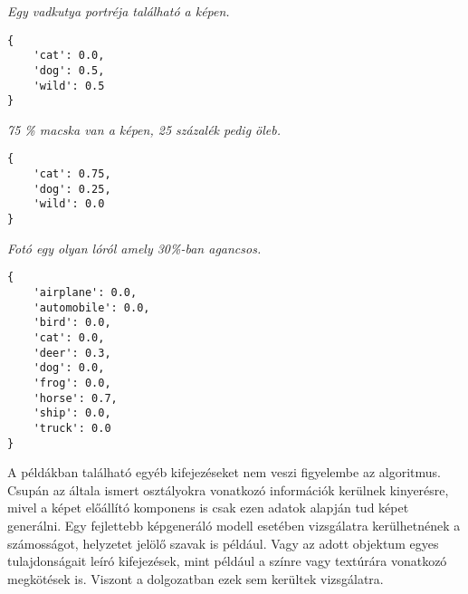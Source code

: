 \noindent\textit{Egy vadkutya portréja található a képen.}
\small{
\begin{verbatim}
{
    'cat': 0.0,
    'dog': 0.5,
    'wild': 0.5
}
\end{verbatim}
}

\noindent\textit{75 \% macska van a képen, 25 százalék pedig öleb.}
\small{
\begin{verbatim}
{
    'cat': 0.75,
    'dog': 0.25,
    'wild': 0.0
}
\end{verbatim}
}

\noindent\textit{Fotó egy olyan lóról amely 30\%-ban agancsos.}
\small{
\begin{verbatim}
{
    'airplane': 0.0,
    'automobile': 0.0,
    'bird': 0.0,
    'cat': 0.0,
    'deer': 0.3,
    'dog': 0.0,
    'frog': 0.0,
    'horse': 0.7,
    'ship': 0.0,
    'truck': 0.0
}
\end{verbatim}
}

A példákban található egyéb kifejezéseket nem veszi figyelembe az algoritmus. Csupán az általa ismert osztályokra vonatkozó információk kerülnek kinyerésre, mivel a képet előállító komponens is csak ezen adatok alapján tud képet generálni. Egy fejlettebb képgeneráló modell esetében vizsgálatra kerülhetnének a számosságot, helyzetet jelölő szavak is például. Vagy az adott objektum egyes tulajdonságait leíró kifejezések, mint például a színre vagy textúrára vonatkozó megkötések is. Viszont a dolgozatban ezek sem kerültek vizsgálatra.
